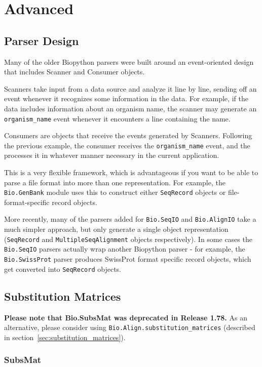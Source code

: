 \chapter{Advanced}
\label{chapter:advanced}

\section{Parser Design}

Many of the older Biopython parsers were built around an event-oriented
design that includes Scanner and Consumer objects.

Scanners take input from a data source and analyze it line by line,
sending off an event whenever it recognizes some information in the
data.  For example, if the data includes information about an organism
name, the scanner may generate an \verb|organism_name| event whenever it
encounters a line containing the name.

Consumers are objects that receive the events generated by Scanners.
Following the previous example, the consumer receives the
\verb|organism_name| event, and the processes it in whatever manner
necessary in the current application.

This is a very flexible framework, which is advantageous if you want to
be able to parse a file format into more than one representation.  For
example, the \verb|Bio.GenBank| module uses this to construct either
\verb|SeqRecord| objects or file-format-specific record objects.

More recently, many of the parsers added for \verb|Bio.SeqIO| and
\verb|Bio.AlignIO| take a much simpler approach, but only generate a
single object representation (\verb|SeqRecord| and
\verb|MultipleSeqAlignment| objects respectively). In some cases the
\verb|Bio.SeqIO| parsers actually wrap
another Biopython parser - for example, the \verb|Bio.SwissProt| parser
produces SwissProt format specific record objects, which get converted
into \verb|SeqRecord| objects.

\section{Substitution Matrices}

\textbf{Please note that Bio.SubsMat was deprecated in Release 1.78.} As an alternative, please consider using \verb|Bio.Align.substitution_matrices| (described in section~\ref{sec:substitution_matrices}).

\subsection{SubsMat}

